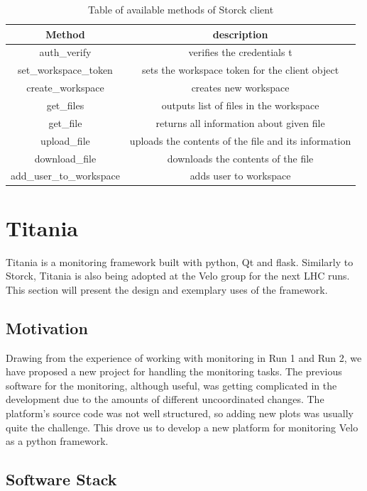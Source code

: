 \begin{table}[h!]
\begin{center}
\begin{tabular}{ |c|c| }
\hline
Method & description \\
\hline
auth\_verify & verifies the credentials t\\
set\_workspace\_token & sets the workspace token for the client object\\
create\_workspace & creates new workspace\\
get\_files & outputs list of files in the workspace\\
get\_file & returns all information about given file\\
upload\_file & uploads the contents of the file and its information\\
download\_file & downloads the contents of the file\\
add\_user\_to\_workspace & adds user to workspace\\
\hline
\end{tabular}
\caption{\label{tab:storck_client}Table of available methods of Storck client}
\end{center}
\end{table}

\section{Titania}

Titania is a monitoring framework built with python, Qt \cite{qtframework} and flask\cite{flask}.
Similarly to Storck, Titania is also being adopted at the Velo group for the next LHC runs.
This section will present the design and exemplary uses of the framework.

\subsection{Motivation}
Drawing from the experience of working with monitoring in Run 1 and Run 2, we have proposed a new project for handling the monitoring tasks.
The previous software for the monitoring, although useful, was getting complicated in the development due to the amounts of different uncoordinated changes.
The platform's source code was not well structured, so adding new plots was usually quite the challenge.
This drove us to develop a new platform for monitoring Velo as a python framework.

\subsection{Software Stack}

